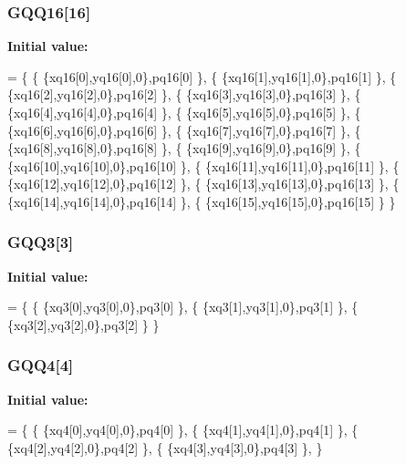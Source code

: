 \subsubsection[{G\-Q\-Q16}]{ G\-Q\-Q16[16]}\label{GaussQuadratureQuad_8cc_ac6c30d3cbb5b45e8ef2f7de48f2e4d6d}
{\bfseries Initial value\-:}
\begin{DoxyCode}
= \{
  \{ \{xq16[0],yq16[0],0\},pq16[0] \},
  \{ \{xq16[1],yq16[1],0\},pq16[1] \},
  \{ \{xq16[2],yq16[2],0\},pq16[2] \},
  \{ \{xq16[3],yq16[3],0\},pq16[3] \},
  \{ \{xq16[4],yq16[4],0\},pq16[4] \},
  \{ \{xq16[5],yq16[5],0\},pq16[5] \},
  \{ \{xq16[6],yq16[6],0\},pq16[6] \},
  \{ \{xq16[7],yq16[7],0\},pq16[7] \},
  \{ \{xq16[8],yq16[8],0\},pq16[8] \},
  \{ \{xq16[9],yq16[9],0\},pq16[9] \},
  \{ \{xq16[10],yq16[10],0\},pq16[10] \},
  \{ \{xq16[11],yq16[11],0\},pq16[11] \},
  \{ \{xq16[12],yq16[12],0\},pq16[12] \},
  \{ \{xq16[13],yq16[13],0\},pq16[13] \},
  \{ \{xq16[14],yq16[14],0\},pq16[14] \},
  \{ \{xq16[15],yq16[15],0\},pq16[15] \}
\}
\end{DoxyCode}
\subsubsection[{G\-Q\-Q3}]{ G\-Q\-Q3[3]}\label{GaussQuadratureQuad_8cc_a3d3cedb99fa6488bfcb5340e05292338}
{\bfseries Initial value\-:}
\begin{DoxyCode}
= \{
  \{ \{xq3[0],yq3[0],0\},pq3[0] \},
  \{ \{xq3[1],yq3[1],0\},pq3[1] \},
  \{ \{xq3[2],yq3[2],0\},pq3[2] \}
\}
\end{DoxyCode}
\subsubsection[{G\-Q\-Q4}]{ G\-Q\-Q4[4]}\label{GaussQuadratureQuad_8cc_a4d442449f3d0cea919e018b4b26b403e}
{\bfseries Initial value\-:}
\begin{DoxyCode}
= \{
  \{ \{xq4[0],yq4[0],0\},pq4[0] \},
  \{ \{xq4[1],yq4[1],0\},pq4[1] \},
  \{ \{xq4[2],yq4[2],0\},pq4[2] \},
  \{ \{xq4[3],yq4[3],0\},pq4[3] \},
\}
\end{DoxyCode}
